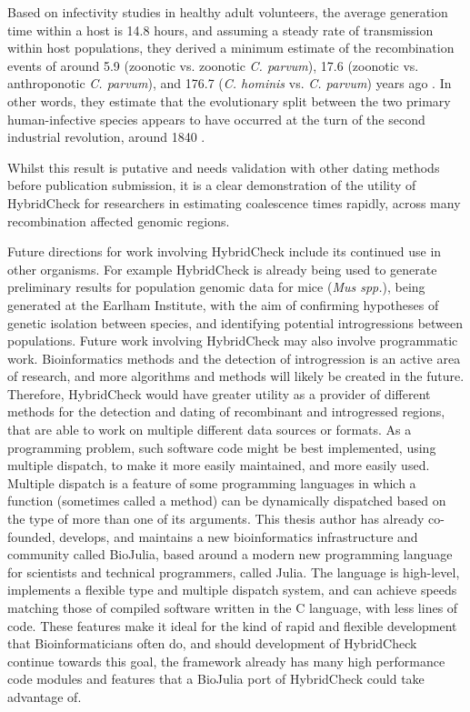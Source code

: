 Based on infectivity studies in healthy adult volunteers, the average generation time within a host is 14.8 hours, and assuming a steady rate of transmission within host populations, they derived a minimum estimate of the recombination events of around 5.9 (zoonotic vs. zoonotic \textit{C. parvum}), 17.6 (zoonotic vs. anthroponotic \textit{C. parvum}), and 176.7 (\textit{C. hominis} vs. \textit{C. parvum}) years ago \parencite{Nader}.
In other words, they estimate that the evolutionary split between the two primary human-infective species appears to have occurred at the turn of the second industrial revolution, around 1840 \parencite{Nader}.

Whilst this result is putative and needs validation with other dating methods before publication submission, it is a clear demonstration of the utility of HybridCheck for researchers in estimating coalescence times rapidly, across many recombination affected genomic regions.

Future directions for work involving HybridCheck include its continued use in other organisms.
For example HybridCheck is already being used to generate preliminary results for population genomic data for mice (\textit{Mus spp.}), being generated at the Earlham Institute, with the aim of confirming hypotheses of genetic isolation between species, and identifying potential introgressions between populations.
Future work involving HybridCheck may also involve programmatic work.
Bioinformatics methods and the detection of introgression is an active area of research, and more algorithms and methods will likely be created in the future.
Therefore, HybridCheck would have greater utility as a provider of different methods for the detection and dating of recombinant and introgressed regions, that are able to work on multiple different data sources or formats.
As a programming problem, such software code might be best implemented, using multiple dispatch, to make it more easily maintained, and more easily used.
Multiple dispatch is a feature of some programming languages in which a function (sometimes called a  method) can be dynamically dispatched based on the type of more than one of its arguments.
This thesis author has already co-founded, develops, and maintains a new bioinformatics infrastructure and community called BioJulia, based around a modern new programming language for scientists and technical programmers, called Julia.
The language is high-level, implements a flexible type and multiple dispatch system, and can achieve speeds matching those of compiled software written in the C language, with less lines of code.
These features make it ideal for the kind of rapid and flexible development that Bioinformaticians often do, and should development of HybridCheck continue towards this goal, the framework already has many high performance code modules and features that a BioJulia port of HybridCheck could take advantage of.

